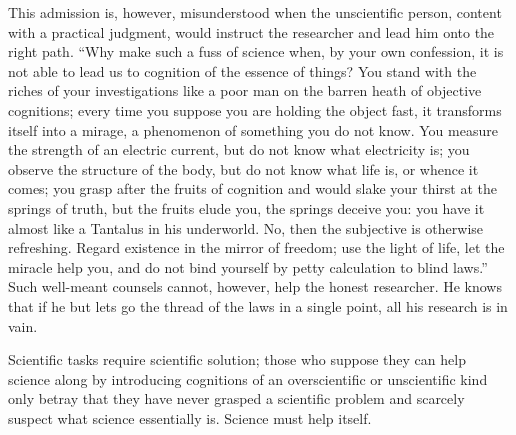 \documentclass[12pt]{book}
\begin{document}
This admission is, however, misunderstood when the unscientific person, content
with a practical judgment, would instruct the researcher and lead him onto the
right path. ``Why make such a fuss of science when, by your own confession, it
is not able to lead us to cognition of the essence of things? You stand with
the riches of your investigations like a poor man on the barren heath of
objective cognitions; every time you suppose you are holding the object fast, it
transforms itself into a mirage, a phenomenon of something you do not know. You
measure the strength of an electric current, but do not know what electricity
is; you observe the structure of the body, but do not know what life is, or
whence it comes; you grasp after the fruits of cognition and would slake your
thirst at the springs of truth, but the fruits elude you, the springs deceive
you: you have it almost like a Tantalus in his underworld. No, then the
subjective is otherwise refreshing. Regard existence in the mirror of freedom;
use the light of life, let the miracle help you, and do not bind yourself by
petty calculation to blind laws.'' Such well-meant counsels cannot, however,
help the honest researcher. He knows that if he but lets go the thread of the
laws in a single point, all his research is in vain.

Scientific tasks require scientific solution; those who suppose they can help
science along by introducing cognitions of an overscientific or unscientific
kind only betray that they have never grasped a scientific problem and scarcely
suspect what science essentially is. Science must help itself.
\end{document}
